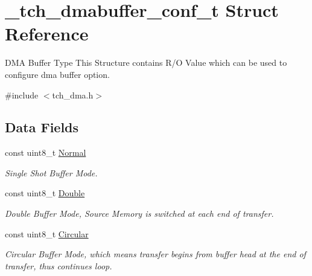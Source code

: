 \hypertarget{struct__tch__dmabuffer__conf__t}{\section{\+\_\+tch\+\_\+dmabuffer\+\_\+conf\+\_\+t Struct Reference}
\label{struct__tch__dmabuffer__conf__t}
}


D\+M\+A Buffer Type This Structure contains R/\+O Value which can be used to configure dma buffer option.  




{\ttfamily \#include $<$tch\+\_\+dma.\+h$>$}

\subsection*{Data Fields}
\begin{DoxyCompactItemize}
\item 
\hypertarget{struct__tch__dmabuffer__conf__t_a2ada797605ea953dc0490338dc598d73}{const uint8\+\_\+t \hyperlink{struct__tch__dmabuffer__conf__t_a2ada797605ea953dc0490338dc598d73}{Normal}}\label{struct__tch__dmabuffer__conf__t_a2ada797605ea953dc0490338dc598d73}

\begin{DoxyCompactList}\small\item\em Single Shot Buffer Mode. \end{DoxyCompactList}\item 
\hypertarget{struct__tch__dmabuffer__conf__t_a8d7a65b47365787f777a4f2b3abb15ac}{const uint8\+\_\+t \hyperlink{struct__tch__dmabuffer__conf__t_a8d7a65b47365787f777a4f2b3abb15ac}{Double}}\label{struct__tch__dmabuffer__conf__t_a8d7a65b47365787f777a4f2b3abb15ac}

\begin{DoxyCompactList}\small\item\em Double Buffer Mode, Source Memory is switched at each end of transfer. \end{DoxyCompactList}\item 
\hypertarget{struct__tch__dmabuffer__conf__t_af77589ae78d6e5733387d7f02d43b82b}{const uint8\+\_\+t \hyperlink{struct__tch__dmabuffer__conf__t_af77589ae78d6e5733387d7f02d43b82b}{Circular}}\label{struct__tch__dmabuffer__conf__t_af77589ae78d6e5733387d7f02d43b82b}

\begin{DoxyCompactList}\small\item\em Circular Buffer Mode, which means transfer begins from buffer head at the end of transfer, thus continues loop. \end{DoxyCompactList}\end{DoxyCompactItemize}


